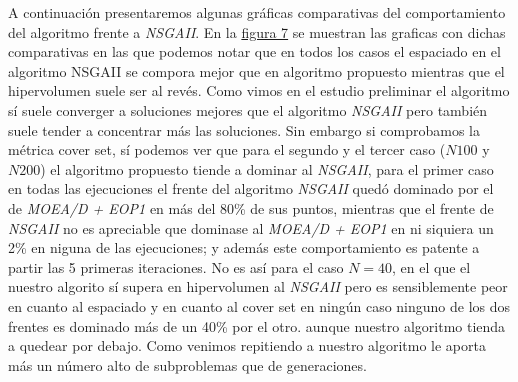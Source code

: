 A continuación presentaremos algunas gráficas comparativas del comportamiento del algoritmo frente a \textit{NSGAII}. En la \hyperref[fig:7]{figura 7} se muestran las graficas con dichas comparativas en las que podemos notar que en todos los casos el espaciado en el algoritmo NSGAII se compora mejor que en algoritmo propuesto mientras que el hipervolumen suele ser al revés. Como vimos en el estudio preliminar el algoritmo sí suele converger a soluciones mejores que el algoritmo \textit{NSGAII} pero también suele tender a concentrar más las soluciones. Sin embargo si comprobamos la métrica cover set, sí podemos ver que para el segundo y el tercer caso ($N100$ y $N200$) el algoritmo propuesto tiende a dominar al \textit{NSGAII}, para el primer caso en todas las ejecuciones el frente del algoritmo \textit{NSGAII} quedó dominado por el de \textit{MOEA/D + EOP1} en más del 80\% de sus puntos, mientras que el frente de  \textit{NSGAII} no es apreciable que dominase al \textit{MOEA/D + EOP1} en ni siquiera un 2\% en niguna de las ejecuciones; y además este comportamiento es patente a partir las 5 primeras iteraciones. No es así para el caso $N=40$, en el que el nuestro algorito sí supera en hipervolumen al \textit{NSGAII} pero es sensiblemente peor en cuanto al espaciado y en cuanto al cover set en ningún caso ninguno de los dos frentes es dominado más de un 40\% por el otro. aunque nuestro algoritmo tienda a quedear por debajo. Como venimos repitiendo a nuestro algoritmo le aporta más un número alto de subproblemas que de generaciones.


